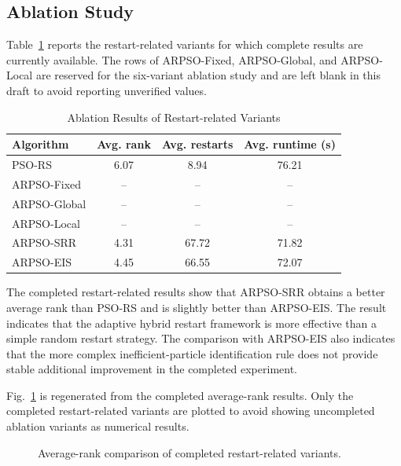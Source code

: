 \subsection{Ablation Study}
Table~\ref{tab:ablation} reports the restart-related variants for which complete results are currently available. The rows of ARPSO-Fixed, ARPSO-Global, and ARPSO-Local are reserved for the six-variant ablation study and are left blank in this draft to avoid reporting unverified values.

\begin{table}[!t]
\caption{Ablation Results of Restart-related Variants}
\centering
\begin{tabular}{lccc}
\toprule
Algorithm & Avg. rank & Avg. restarts & Avg. runtime (s) \\
\midrule
PSO-RS & 6.07 & 8.94 & 76.21 \\
ARPSO-Fixed & -- & -- & -- \\
ARPSO-Global & -- & -- & -- \\
ARPSO-Local & -- & -- & -- \\
ARPSO-SRR & 4.31 & 67.72 & 71.82 \\
ARPSO-EIS & 4.45 & 66.55 & 72.07 \\
\bottomrule
\end{tabular}
\label{tab:ablation}
\end{table}

The completed restart-related results show that ARPSO-SRR obtains a better average rank than PSO-RS and is slightly better than ARPSO-EIS. The result indicates that the adaptive hybrid restart framework is more effective than a simple random restart strategy. The comparison with ARPSO-EIS also indicates that the more complex inefficient-particle identification rule does not provide stable additional improvement in the completed experiment.

Fig.~\ref{fig:ablation} is regenerated from the completed average-rank results. Only the completed restart-related variants are plotted to avoid showing uncompleted ablation variants as numerical results.

\begin{figure}[!t]
    \centering
    \caption{Average-rank comparison of completed restart-related variants.}
    \label{fig:ablation}
\end{figure}

